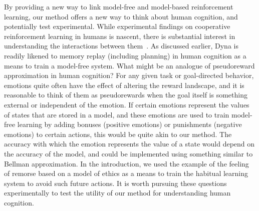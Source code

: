 \documentclass[letterpaper]{article}
\begin{document}
By providing a new way to link model-free and model-based reinforcement learning, our method offers a new way to think about human cognition, and potentially test experimental. While experimental findings on cooperative reinforcement learning in humans is nascent, there is substantial interest in understanding the interactions between them~\cite{daw2014algorithmic}. As discussed earlier, Dyna is readily likened to memory replay (including planning) in human cognition as a means to train a model-free system. What might be an analogue of pseudoreward approximation in human cognition? For any given task or goal-directed behavior, emotions quite often have the effect of altering the reward landscape, and it is reasonable to think of them as pseudorewards when the goal itself is something external or independent of the emotion. If certain emotions represent the values of states that are stored in a model, and these emotions are used to train model-free learning by adding bonuses (positive emotions) or punishments (negative emotions) to certain actions, this would be quite akin to our method. The accuracy with which the emotion represents the value of a state would depend on the accuracy of the model, and could be implemented using something similar to Bellman approximation. In the introduction, we used the example of the feeling of remorse based on a model of ethics as a means to train the habitual learning system to avoid such future actions. It is worth pursuing these questions experimentally to test the utility of our method for understanding human cognition.

{}

\end{document}
